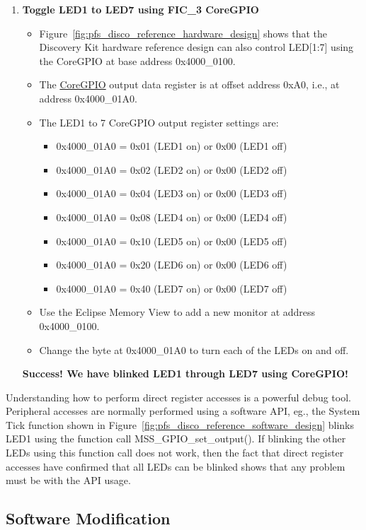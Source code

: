 \begin{enumerate}
\item \textbf{Toggle LED1 to LED7 using FIC\_3 CoreGPIO}
%
\begin{itemize}
\item Figure~\ref{fig:pfs_disco_reference_hardware_design} shows that the
Discovery Kit hardware reference design can also control LED[1:7] using
the CoreGPIO at base address 0x4000\_0100.
%
\item The \href{https://ww1.microchip.com/downloads/aemDocuments/documents/FPGA/ProductDocuments/UserGuides/ip_cores/directcores/CoreGPIO_HB.pdf}{CoreGPIO}
output data register is at offset address 0xA0, i.e., at address 0x4000\_01A0.
%
\item The LED1 to 7 CoreGPIO output register settings are:
\begin{itemize}
\item 0x4000\_01A0 = 0x01 (LED1 on) or 0x00 (LED1 off)
\item 0x4000\_01A0 = 0x02 (LED2 on) or 0x00 (LED2 off)
\item 0x4000\_01A0 = 0x04 (LED3 on) or 0x00 (LED3 off)
\item 0x4000\_01A0 = 0x08 (LED4 on) or 0x00 (LED4 off)
\item 0x4000\_01A0 = 0x10 (LED5 on) or 0x00 (LED5 off)
\item 0x4000\_01A0 = 0x20 (LED6 on) or 0x00 (LED6 off)
\item 0x4000\_01A0 = 0x40 (LED7 on) or 0x00 (LED7 off)
\end{itemize}
%
\item Use the Eclipse Memory View to add a new monitor at address 0x4000\_0100.
\item Change the byte at 0x4000\_01A0 to turn each of the LEDs on and off.
\end{itemize}
\textcolor{OliveGreen}{\bf Success! We have blinked LED1 through LED7 using CoreGPIO!}
\end{enumerate}
%
Understanding how to perform direct register accesses is a powerful debug tool.
Peripheral accesses are normally performed using a software API, eg.,
the System Tick function shown in Figure~\ref{fig:pfs_disco_reference_software_design}
blinks LED1 using the function call MSS\_GPIO\_set\_output().
If blinking the other LEDs using this function call does not work, then the
fact that direct register accesses have confirmed that all LEDs can be blinked
shows that any problem must be with the API usage.

\subsection{Software Modification}

